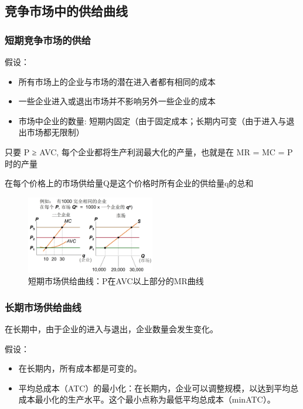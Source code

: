 \documentclass[12pt, a4paper]{article}
\begin{document}
\subsection{竞争市场中的供给曲线}

\subsubsection{短期竞争市场的供给}

假设：

\begin{itemize}
  \item 所有市场上的企业与市场的潜在进入者都有相同的成本

  \item 一些企业进入或退出市场并不影响另外一些企业的成本

  \item 市场中企业的数量: 短期内固定（由于固定成本；长期内可变（由于进入与退出市场都无限制）
\end{itemize}

只要 P ≥ AVC, 每个企业都将生产利润最大化的产量，也就是在 MR = MC = P时的产量

在每个价格上的市场供给量Q是这个价格时所有企业的供给量q的总和

\begin{figure}[H] 
  \centering %
  \includegraphics[width=0.5\textwidth]{短期市场供给曲线.png} 
  \caption{短期市场供给曲线：P在AVC以上部分的MR曲线} %
\end{figure}

\subsubsection{长期市场供给曲线}
在长期中，由于企业的进入与退出，企业数量会发生变化。

假设：
\begin{itemize}
    \item 在长期内，所有成本都是可变的。
    \item 平均总成本（ATC）的最小化：在长期内，企业可以调整规模，以达到平均总成本最小化的生产水平。这个最小点称为最低平均总成本（minATC）。
\end{itemize}
\end{document}
